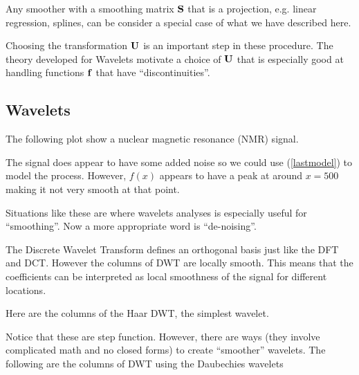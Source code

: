 Any smoother with a smoothing matrix ${\mathbf S}$ that is a
projection, e.g. linear regression, splines, can be consider a special
case of what we have described here. 

Choosing the transformation ${\mathbf U}$ is an important step in these
procedure. The theory developed for Wavelets motivate a choice of
${\mathbf U}$ that is especially good at handling functions ${\mathbf f}$ that have
``discontinuities''.  

\subsection{Wavelets}
The following plot show a nuclear magnetic resonance (NMR) signal. 



\begin{figure}[htb]
\begin{center}
\end{center}
\end{figure}


The signal does appear to have some added noise so  we could use 
(\ref{lastmodel}) to model the process. However,  $f(x)$ appears to
have a peak at around $x=500$ making it not very smooth at that point.

Situations like these are where wavelets analyses is especially useful
for ``smoothing''. Now a more appropriate word is ``de-noising''.

The Discrete Wavelet Transform defines an orthogonal basis just like
the DFT and DCT. However the columns of DWT are locally smooth. This
means that the coefficients can be interpreted as local smoothness of
the signal for different locations. 

Here are the columns of the Haar DWT, the simplest wavelet.


\begin{figure}[htb]
\begin{center}
\end{center}
\end{figure}


Notice that these are step function. However, there are ways (they
involve complicated math and no closed forms) to create ``smoother''
wavelets. The following are the columns of DWT using the Daubechies wavelets



